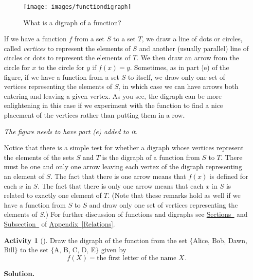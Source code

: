 \documentclass[10pt,]{book}
\theoremstyle{plain}
\theoremstyle{definition}
\newtheorem{activity}[project]{Activity}
\numberwithin{equation}{chapter}
\begin{document}
\begin{figure}
\centering
\texttt{[image: images/functiondigraph]}
\caption{What is a digraph of a function?\label{functiondigraphs}}
\end{figure}
If we have a function \(f\) from a set \(S\) to a set \(T\), we draw a line of dots or circles, called \emph{vertices} to represent the elements of \(S\) and another (usually parallel) line of circles or dots to represent the elements of \(T\). We then draw an arrow from the circle for \(x\) to the circle for \(y\) if \(f(x) = y\). Sometimes, as in part (e) of the figure, if we have a function from a set \(S\) to itself, we draw only one set of vertices representing the elements of \(S\), in which case we can have arrows both entering and leaving a given vertex. As you see, the digraph can be more enlightening in this case if we experiment with the function to find a nice placement of the vertices rather than putting them in a row.%
\par
\emph{The figure needs to have part (e) added to it.}%
\par
Notice that there is a simple test for whether a digraph whose vertices represent the elements of the sets \(S\) and \(T\) is the digraph of a function from \(S\) to \(T\). There must be one and only one arrow leaving each vertex of the digraph representing an element of \(S\). The fact that there is one arrow means that \(f(x)\) is defined for each \(x\) in \(S\). The fact that there is only one arrow means that each \(x\) in \(S\) is related to exactly one element of \(T\). (Note that these remarks hold as well if we have a function from \(S\) to \(S\) and draw only one set of vertices representing the elements of \(S\).) For further discussion of functions and digraphs see \hyperref[functionrelation]{Sections~} and \hyperref[relationdigraph]{Subsection~} of {\hyperref[Relations]{Appendix~\ref{Relations}}}.%
\begin{activity}[]\label{activity-23}
Draw the digraph of the function from the set \(\{\)Alice, Bob, Dawn, Bill\(\}\) to the set \(\{\)A, B, C, D, E\(\}\) given by%
\begin{equation*}
f(X) = \mbox{the first
letter of the name \(X\)} .
\end{equation*}
%
\par\medskip\noindent%
\textbf{Solution.}\quad \leavevmode%
\begin{figure}
\centering
{
}
\end{figure}
\end{activity}
\end{document}
